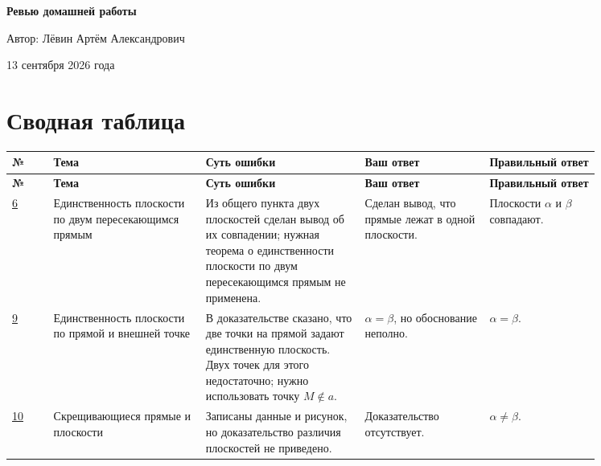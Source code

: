 \documentclass[12pt,a4paper]{article}
\begin{document}
\begin{titlepage}
\thispagestyle{empty}
\begin{center}
\vspace*{0.28\textheight}
{\LARGE\bfseries Ревью домашней работы\par}
\vspace{1.5cm}
{\large Автор: Лёвин Артём Александрович\par}
\vspace{0.7cm}
{\large 13 сентября 2026 года\par}
\vfill
{}
\end{center}
\end{titlepage}

\newpage
\section*{Сводная таблица}
\small
\setlength{\tabcolsep}{3pt}
\begin{longtable}{@{}>{\centering\arraybackslash}p{0.06\linewidth} p{0.22\linewidth} p{0.23\linewidth} p{0.18\linewidth} p{0.16\linewidth}@{}}
\toprule
\textbf{№} & \textbf{Тема} & \textbf{Суть ошибки} & \textbf{Ваш ответ} & \textbf{Правильный ответ}\\
\midrule
\endfirsthead
\toprule
\textbf{№} & \textbf{Тема} & \textbf{Суть ошибки} & \textbf{Ваш ответ} & \textbf{Правильный ответ}\\
\midrule
\endhead
\hyperref[task:6]{6} & Единственность плоскости по двум пересекающимся прямым & Из общего пункта двух плоскостей сделан вывод об их совпадении; нужная теорема о единственности плоскости по двум пересекающимся прямым не применена. & Сделан вывод, что прямые лежат в одной плоскости. & Плоскости $\alpha$ и $\beta$ совпадают.\\
\addlinespace
\hyperref[task:9]{9} & Единственность плоскости по прямой и внешней точке & В доказательстве сказано, что две точки на прямой задают единственную плоскость. Двух точек для этого недостаточно; нужно использовать точку $M\notin a$. & $\alpha=\beta$, но обоснование неполно. & $\alpha=\beta$.\\
\addlinespace
\hyperref[task:10]{10} & Скрещивающиеся прямые и плоскости & Записаны данные и рисунок, но доказательство различия плоскостей не приведено. & Доказательство отсутствует. & $\alpha\ne\beta$.\\
\bottomrule
\end{longtable}
\normalsize
\end{document}
